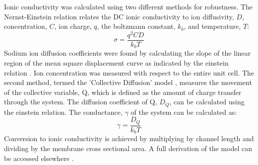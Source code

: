 


Ionic conductivity was calculated using two different methods for
robustness. The Nernst-Einstein relation relates 
the DC ionic conductivity to ion diffusivity, $D$, concentration,
$C$, ion charge, $q$, the boltzmann constant, $k_b$, and temperature,
$T$: $$\sigma = \dfrac{q^2CD}{k_b T}$$ Sodium ion diffusion 
coefficients were found by calculating the slope of the linear
region of the mean square displacement curve as indicated by the
einstein relation \cite{einstein_investigations_1956}. Ion concentration
was measured with respect to the entire unit cell. The second method, 
termed the 'Collective Diffusion' model \cite{liu_collective_2013}, 
measures the movement of the collective variable, Q, which is defined as
the amount of charge transfer through the system. The diffusion 
coefficient of Q, $D_Q$, can be calculated using the einstein relation.
The conductance, $\gamma$ of the system can be calculated as:
$$ \gamma = \dfrac{D_Q}{k_b T} $$ Conversion to ionic conductivity is
achieved by multiplying by channel length and dividing by the membrane
cross sectional area. A full derivation of the model can be accessed 
elsewhere \cite{liu_collective_2013}.  

